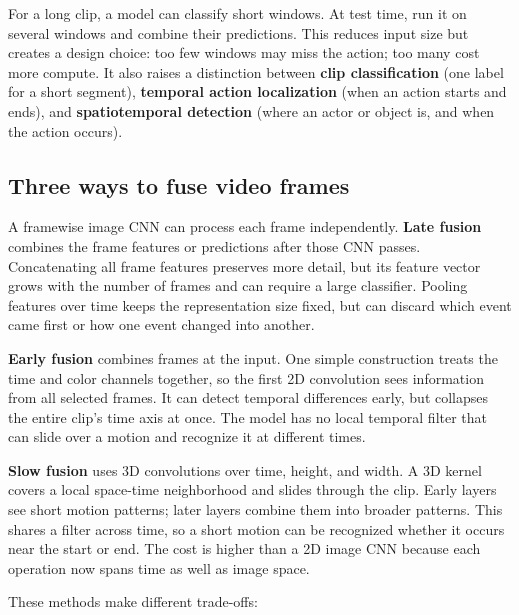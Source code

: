 For a long clip, a model can classify short windows. At test time, run it on several windows and combine their predictions. This reduces input size but creates a design choice: too few windows may miss the action; too many cost more compute. It also raises a distinction between \textbf{clip classification} (one label for a short segment), \textbf{temporal action localization} (when an action starts and ends), and \textbf{spatiotemporal detection} (where an actor or object is, and when the action occurs).

\subsection{Three ways to fuse video frames}\label{04-visual-computing-ii-ch031-three-ways-to-fuse-video-frames}

\hypertarget{04-visual-computing-ii-ch031-three-ways-to-fuse-video-frames}{}

A framewise image CNN can process each frame independently. \textbf{Late fusion} combines the frame features or predictions after those CNN passes. Concatenating all frame features preserves more detail, but its feature vector grows with the number of frames and can require a large classifier. Pooling features over time keeps the representation size fixed, but can discard which event came first or how one event changed into another.

\textbf{Early fusion} combines frames at the input. One simple construction treats the time and color channels together, so the first 2D convolution sees information from all selected frames. It can detect temporal differences early, but collapses the entire clip's time axis at once. The model has no local temporal filter that can slide over a motion and recognize it at different times.

\textbf{Slow fusion} uses 3D convolutions over time, height, and width. A 3D kernel covers a local space-time neighborhood and slides through the clip. Early layers see short motion patterns; later layers combine them into broader patterns. This shares a filter across time, so a short motion can be recognized whether it occurs near the start or end. The cost is higher than a 2D image CNN because each operation now spans time as well as image space.

These methods make different trade-offs:

